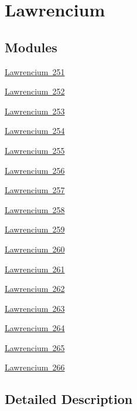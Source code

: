 \hypertarget{group___isotope_const-_lawrencium}{}\section{Lawrencium}
\label{group___isotope_const-_lawrencium}
\subsection*{Modules}
\begin{DoxyCompactItemize}
\item 
\mbox{\hyperlink{group___isotope_const-_lawrencium-_lr251}{Lawrencium 251}}
\item 
\mbox{\hyperlink{group___isotope_const-_lawrencium-_lr252}{Lawrencium 252}}
\item 
\mbox{\hyperlink{group___isotope_const-_lawrencium-_lr253}{Lawrencium 253}}
\item 
\mbox{\hyperlink{group___isotope_const-_lawrencium-_lr254}{Lawrencium 254}}
\item 
\mbox{\hyperlink{group___isotope_const-_lawrencium-_lr255}{Lawrencium 255}}
\item 
\mbox{\hyperlink{group___isotope_const-_lawrencium-_lr256}{Lawrencium 256}}
\item 
\mbox{\hyperlink{group___isotope_const-_lawrencium-_lr257}{Lawrencium 257}}
\item 
\mbox{\hyperlink{group___isotope_const-_lawrencium-_lr258}{Lawrencium 258}}
\item 
\mbox{\hyperlink{group___isotope_const-_lawrencium-_lr259}{Lawrencium 259}}
\item 
\mbox{\hyperlink{group___isotope_const-_lawrencium-_lr260}{Lawrencium 260}}
\item 
\mbox{\hyperlink{group___isotope_const-_lawrencium-_lr261}{Lawrencium 261}}
\item 
\mbox{\hyperlink{group___isotope_const-_lawrencium-_lr262}{Lawrencium 262}}
\item 
\mbox{\hyperlink{group___isotope_const-_lawrencium-_lr263}{Lawrencium 263}}
\item 
\mbox{\hyperlink{group___isotope_const-_lawrencium-_lr264}{Lawrencium 264}}
\item 
\mbox{\hyperlink{group___isotope_const-_lawrencium-_lr265}{Lawrencium 265}}
\item 
\mbox{\hyperlink{group___isotope_const-_lawrencium-_lr266}{Lawrencium 266}}
\end{DoxyCompactItemize}


\subsection{Detailed Description}
